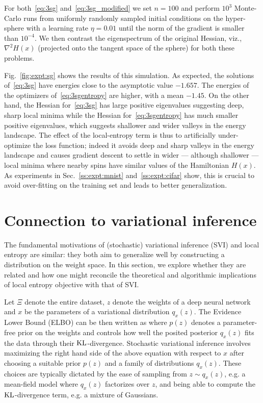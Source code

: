 \documentclass[10pt]{article}
\begin{document}
\begin{appendices}
{For both~\eqref{eq:3sg} and~\eqref{eq:3sg_modified} we set $n = 100$ and perform $10^3$ Monte-Carlo runs from uniformly randomly sampled initial conditions on the hyper-sphere with a learning rate $\eta = 0.01$ until the norm of the gradient is smaller than $10^{-4}$. We then contrast the eigenspectrum of the original Hessian, viz., $\nabla^2 H(x)$ (projected onto the tangent space of the sphere) for both these problems.

Fig.~\ref{fig:expt:sg} shows the results of this simulation. As expected, the solutions of~\eqref{eq:3sg} have energies close to the asymptotic value $-1.657$. The energies of the optimizers of~\eqref{eq:3sgentropy} are higher, with a mean $-1.45$. On the other hand, the Hessian for~\eqref{eq:3sg} has large positive eigenvalues suggesting deep, sharp local minima while the Hessian for~\eqref{eq:3sgentropy} has much smaller positive eigenvalues, which suggests shallower and wider valleys in the energy landscape. The effect of the local-entropy term is thus to artificially under-optimize the loss function; indeed it avoids deep and sharp valleys in the energy landscape and causes gradient descent to settle in wider --- although shallower --- local minima where nearby spins have similar values of the Hamiltonian $H(x)$. As experiments in Sec.~\ref{ss:expt:mnist} and~\ref{ss:expt:cifar} show, this is crucial to avoid over-fitting on the training set and leads to better generalization.
}

\section{Connection to variational inference}
\label{s:app:connection_variational}

\newcommand{\kl}{\trm{KL}}
The fundamental motivations of (stochastic) variational inference (SVI) and local entropy are similar: they both aim to generalize well by constructing a distribution on the weight space. In this section, we explore whether they are related and how one might reconcile the theoretical and algorithmic implications of local entropy objective with that of SVI.

Let $\Xi$ denote the entire dataset, $z$ denote the weights of a deep neural network and $x$ be the parameters of a variational distribution $q_x(z)$. The Evidence Lower Bound (ELBO) can be then written as
\beq{
    \log p(\Xi) \geq \E_{z \sim q_x(z)}\ \sqbrac{\log p(\Xi\ |\ z)} - \kl \rbrac{q_x(z)\ ||\ p(z)};
    \label{eq:elbo}
}
where $p(z)$ denotes a parameter-free prior on the weights and controls how well the posited posterior $q_x(z)$ fits the data through their $\kl$-divergence. Stochastic variational inference involves maximizing the right hand side of the above equation with respect to $x$ after choosing a suitable prior $p(z)$ and a family of distributions $q_x(z)$. These choices are typically dictated by the ease of sampling from $z \sim q_x(z)$, e.g. a mean-field model where $q_x(z)$ factorizes over $z$, and being able to compute the $\kl$-divergence term, e.g. a mixture of Gaussians.


\end{appendices}
\end{document}
